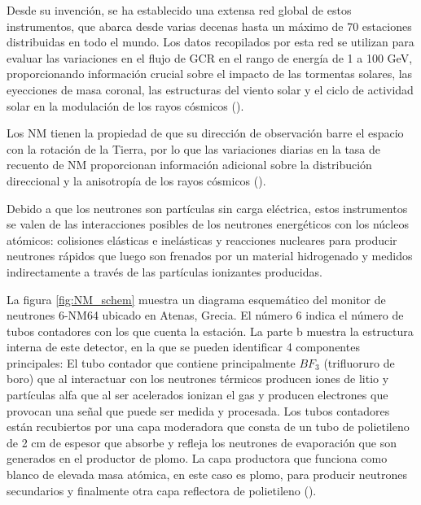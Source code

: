 Desde su invención, se ha establecido una extensa red global de estos instrumentos, que abarca desde varias decenas hasta un máximo de 70 estaciones distribuidas en todo el mundo. Los datos recopilados por esta red se utilizan para evaluar las variaciones en el flujo de GCR en el rango de energía de 1 a 100 GeV, proporcionando información crucial sobre el impacto de las tormentas solares, las eyecciones de masa coronal, las estructuras del viento solar y el ciclo de actividad solar en la modulación de los rayos cósmicos (\cite{Ruffolo_2016}).

Los NM tienen la propiedad de que su dirección de observación barre el espacio con la rotación de la Tierra, por lo que las variaciones diarias en la tasa de recuento de NM proporcionan información adicional sobre la distribución direccional y la anisotropía de los rayos cósmicos (\cite{Ruffolo_2016}). 

Debido a que los neutrones son partículas sin carga eléctrica, estos instrumentos se valen de las interacciones posibles de los neutrones energéticos con los núcleos atómicos: colisiones elásticas e inelásticas y reacciones nucleares para producir neutrones rápidos que luego son frenados por un material hidrogenado y medidos indirectamente a través de las partículas ionizantes producidas.

La figura \ref{fig:NM_schem} muestra un diagrama esquemático del monitor de neutrones 6-NM64 ubicado en Atenas, Grecia. El número 6 indica el número de tubos contadores con los que cuenta la estación. La parte b muestra la estructura interna de este detector, en la que se pueden identificar 4 componentes principales: El tubo contador que contiene principalmente $BF_{3}$ (trifluoruro de boro) que al interactuar con los neutrones térmicos producen iones de litio y partículas alfa que al ser acelerados ionizan el gas y producen electrones que provocan una señal que puede ser medida y procesada. Los tubos contadores están recubiertos por una capa moderadora que consta de un tubo de polietileno de 2 cm de espesor que absorbe y refleja los neutrones de evaporación que son generados en el productor de plomo. La capa productora que funciona como blanco de elevada masa atómica, en este caso es plomo, para producir neutrones secundarios y finalmente otra capa reflectora de polietileno (\cite{OlgaMalandraki_2018}).



